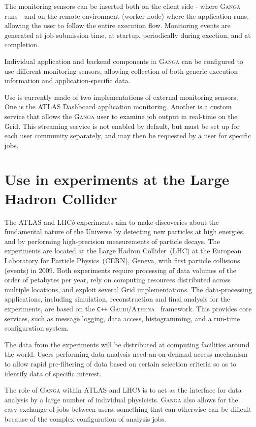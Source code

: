\documentclass{elsart}
\def\lhcb {LHC{\em b\/}\xspace}
\def\atlas {ATLAS\xspace}
\def\lhc {LHC\xspace}
\def\ganga {\textsc{Ganga}\xspace}
\def\gaudi {\textsc{Gaudi}\xspace}
\def\athena {\textsc{Athena}\xspace}
\def\grid {Grid\xspace}
\newcommand{\code}[1]{\texttt{#1}}
\begin{document}
The monitoring sensors can be inserted both on the client side - where \ganga
runs - and on the remote environment (worker node) where the application
runs, allowing the user to follow the entire execution flow.  Monitoring
events are generated at job submission time, at startup, periodically
during exection, and at completion.

Individual application and backend components in \ganga can be configured to use
different monitoring sensors, allowing collection of both generic execution
information and application-specific data.

Use is currently made of two implementations of external monitoring sensors. One
is the \atlas Dashboard application monitoring\cite{andreeva_2008}.
Another is a custom service that allows the \ganga user to examine job output
in real-time on the \grid.  This streaming service
is not enabled by default, but must be set up for each user community separately,
and may then be requested by a user for specific jobs.

\section{Use in experiments at the Large Hadron Collider}
\label{sec:useHEP}

The \atlas and \lhcb experiments aim to make discoveries about the
fundamental nature of the Universe by detecting new particles at 
high energies, and by performing high-precision measurements of
particle decays. The experiments
are located at the Large Hadron Collider~(\lhc) at the European Laboratory for
Particle Physics~(CERN), Geneva, with first particle collisions (events) in
2009. Both experiments require processing of data
volumes of the order of petabytes per year, rely on computing resources
distributed across multiple locations, and exploit several \grid implementations. The data-processing applications,
including simulation, reconstruction and final analysis for the experiments,
are based on the \code{C++} \gaudi/\athena~\cite{gaudi} framework.  This
provides core services, such as message logging, data access, histogramming,
and a run-time configuration system. 

The data from the experiments will be distributed at computing facilities
around the world. Users performing data analysis need an on-demand access
mechanism to allow rapid pre-filtering of data based on certain selection
criteria so as to identify data of specific interest.

The role of \ganga within \atlas and \lhcb is to act as the interface for data
analysis by a large number of individual physicists. \ganga also allows for
the easy exchange of jobs between users, something that can otherwise can be dificult
because of the complex configuration of analysis jobs.
\end{document}
